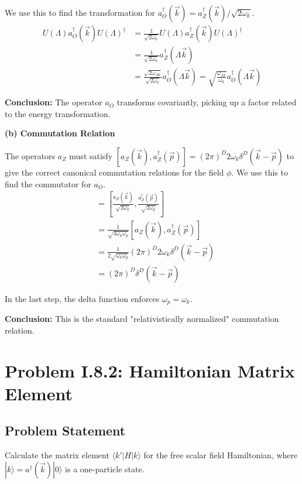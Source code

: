 \documentclass[11pt]{article}
\begin{document}
\begin{itemize}
We use this to find the transformation for $a_O^\dagger(\vec{k}) = a_Z^\dagger(\vec{k})/\sqrt{2\omega_k}$.
\begin{align*}
    U(\Lambda) a_O^\dagger(\vec{k}) U(\Lambda)^\dagger &= \frac{1}{\sqrt{2\omega_k}} U(\Lambda) a_Z^\dagger(\vec{k}) U(\Lambda)^\dagger \\
    &= \frac{1}{\sqrt{2\omega_k}} a_Z^\dagger(\Lambda\vec{k}) \\
    &= \frac{\sqrt{2\omega_{\Lambda k}}}{\sqrt{2\omega_k}} a_O^\dagger(\Lambda\vec{k}) = \sqrt{\frac{\omega_{\Lambda k}}{\omega_k}} a_O^\dagger(\Lambda\vec{k})
\end{align*}

\textbf{Conclusion:} The operator $a_O$ transforms covariantly, picking up a factor related to the energy transformation.

\textbf{(b) Commutation Relation}

The operators $a_Z$ must satisfy $[a_Z(\vec{k}), a_Z^\dagger(\vec{p})] = (2\pi)^D 2\omega_k \delta^D(\vec{k}-\vec{p})$ to give the correct canonical commutation relations for the field $\phi$. We use this to find the commutator for $a_O$.
\begin{align*}
    [a_O(\vec{k}), a_O^\dagger(\vec{p})] &= \left[ \frac{a_Z(\vec{k})}{\sqrt{2\omega_k}}, \frac{a_Z^\dagger(\vec{p})}{\sqrt{2\omega_p}} \right] \\
    &= \frac{1}{\sqrt{4\omega_k \omega_p}} [a_Z(\vec{k}), a_Z^\dagger(\vec{p})] \\
    &= \frac{1}{2\sqrt{\omega_k \omega_p}} (2\pi)^D 2\omega_k \delta^D(\vec{k}-\vec{p}) \\
    &= (2\pi)^D \delta^D(\vec{k}-\vec{p})
\end{align*}

In the last step, the delta function enforces $\omega_p = \omega_k$. 

\textbf{Conclusion:} This is the standard "relativistically normalized" commutation relation.

\newpage

\section{Problem I.8.2: Hamiltonian Matrix Element}

\subsection{Problem Statement}
Calculate the matrix element $\langle k'|H|k\rangle$ for the free scalar field Hamiltonian, where $|k\rangle = a^\dagger(\vec{k})|0\rangle$ is a one-particle state.


\end{itemize}
\end{document}
